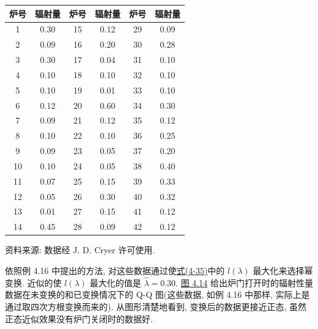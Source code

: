 
\begin{mvtable}
\label{tab:4.5}
\begin{tabular}{cc@{\hspace{2.2em}}cc@{\hspace{2.2em}}cc}
\toprule
炉号 & 辐射量 & 炉号 & 辐射量 & 炉号 & 辐射量 \\
\midrule
1 & 0.30 & 15 & 0.12 & 29 & 0.09 \\
2 & 0.09 & 16 & 0.20 & 30 & 0.28 \\
3 & 0.30 & 17 & 0.04 & 31 & 0.10 \\
4 & 0.10 & 18 & 0.10 & 32 & 0.10 \\
5 & 0.10 & 19 & 0.01 & 33 & 0.10 \\
6 & 0.12 & 20 & 0.60 & 34 & 0.30 \\
7 & 0.09 & 21 & 0.12 & 35 & 0.12 \\
8 & 0.10 & 22 & 0.10 & 36 & 0.25 \\
9 & 0.09 & 23 & 0.05 & 37 & 0.20 \\
10 & 0.10 & 24 & 0.05 & 38 & 0.40 \\
11 & 0.07 & 25 & 0.15 & 39 & 0.33 \\
12 & 0.05 & 26 & 0.30 & 40 & 0.32 \\
13 & 0.01 & 27 & 0.15 & 41 & 0.12 \\
14 & 0.45 & 28 & 0.09 & 42 & 0.12 \\
\bottomrule
\end{tabular}
\end{mvtable}
{资料来源: 数据经 J. D. Cryer 许可使用.}

依照例 4.16 中提出的方法, 对这些数据通过使\hyperref[eq:4-35]{式(4-35)}中的 $l(\lambda)$ 最大化来选择幂变换. 近似的使 $l(\lambda)$ 最大化的值是 $\hat{\lambda} = 0.30$. \hyperref[fig:4.14]{图 4.14} 给出炉门打开时的辐射性量数据在未变换的和已变换情况下的 Q-Q 图(这些数据, 如例 4.16 中那样, 实际上是通过取四次方根变换而来的). 从图形清楚地看到, 变换后的数据更接近正态, 虽然正态近似效果没有炉门关闭时的数据好.

